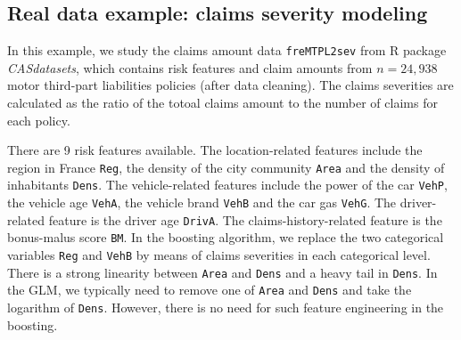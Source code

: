 \documentclass[11pt]{article}
\numberwithin{equation}{section}
\begin{document}


\subsection{Real data example: claims severity modeling}\label{sec:third example}

In this example, we study the claims amount data {\tt freMTPL2sev} from R package {\it CASdatasets}, which contains risk features and  claim amounts from $n=24,938$ motor third-part liabilities policies (after data cleaning). 
The claims severities are calculated as the ratio of the totoal claims amount to the number of claims for each policy.

There are 9 risk features available. 
The location-related features include the region in France {\tt Reg}, the density of the city community {\tt Area} and the density of inhabitants {\tt Dens}.
The vehicle-related features include the power of the car {\tt VehP}, the vehicle age {\tt VehA}, the vehicle brand {\tt VehB} and the car gas {\tt VehG}.
The driver-related feature is the driver age {\tt DrivA}. 
The claims-history-related feature is the bonus-malus score  {\tt BM}.  
In the boosting algorithm, we replace the two categorical variables {\tt Reg} and {\tt VehB} by means of claims severities in each categorical level.
There is a strong linearity between {\tt Area} and {\tt Dens} and a heavy tail in {\tt Dens}. 
In the GLM, we typically need to remove one of {\tt Area} and {\tt Dens} and take the logarithm of {\tt Dens}.
However, there is no need for such feature engineering in the boosting.
\end{document}
